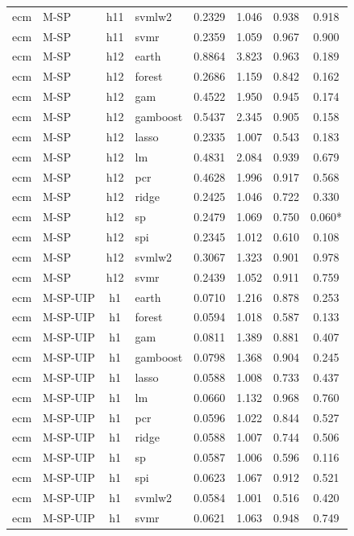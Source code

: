 \begin{ThreePartTable}
\begin{longtable}[t]{llclcccc}
ecm & M-SP & h11 & svmlw2 & 0.2329 & 1.046 & 0.938 & 0.918\\
ecm & M-SP & h11 & svmr & 0.2359 & 1.059 & 0.967 & 0.900\\
\addlinespace
ecm & M-SP & h12 & earth & 0.8864 & 3.823 & 0.963 & 0.189\\
ecm & M-SP & h12 & forest & 0.2686 & 1.159 & 0.842 & 0.162\\
ecm & M-SP & h12 & gam & 0.4522 & 1.950 & 0.945 & 0.174\\
ecm & M-SP & h12 & gamboost & 0.5437 & 2.345 & 0.905 & 0.158\\
ecm & M-SP & h12 & lasso & 0.2335 & 1.007 & 0.543 & 0.183\\
ecm & M-SP & h12 & lm & 0.4831 & 2.084 & 0.939 & 0.679\\
ecm & M-SP & h12 & pcr & 0.4628 & 1.996 & 0.917 & 0.568\\
ecm & M-SP & h12 & ridge & 0.2425 & 1.046 & 0.722 & 0.330\\
ecm & M-SP & h12 & sp & 0.2479 & 1.069 & 0.750 & 0.060*\\
ecm & M-SP & h12 & spi & 0.2345 & 1.012 & 0.610 & 0.108\\
ecm & M-SP & h12 & svmlw2 & 0.3067 & 1.323 & 0.901 & 0.978\\
ecm & M-SP & h12 & svmr & 0.2439 & 1.052 & 0.911 & 0.759\\
\addlinespace
ecm & M-SP-UIP & h1 & earth & 0.0710 & 1.216 & 0.878 & 0.253\\
ecm & M-SP-UIP & h1 & forest & 0.0594 & 1.018 & 0.587 & 0.133\\
ecm & M-SP-UIP & h1 & gam & 0.0811 & 1.389 & 0.881 & 0.407\\
ecm & M-SP-UIP & h1 & gamboost & 0.0798 & 1.368 & 0.904 & 0.245\\
ecm & M-SP-UIP & h1 & lasso & 0.0588 & 1.008 & 0.733 & 0.437\\
ecm & M-SP-UIP & h1 & lm & 0.0660 & 1.132 & 0.968 & 0.760\\
ecm & M-SP-UIP & h1 & pcr & 0.0596 & 1.022 & 0.844 & 0.527\\
ecm & M-SP-UIP & h1 & ridge & 0.0588 & 1.007 & 0.744 & 0.506\\
ecm & M-SP-UIP & h1 & sp & 0.0587 & 1.006 & 0.596 & 0.116\\
ecm & M-SP-UIP & h1 & spi & 0.0623 & 1.067 & 0.912 & 0.521\\
ecm & M-SP-UIP & h1 & svmlw2 & 0.0584 & 1.001 & 0.516 & 0.420\\
ecm & M-SP-UIP & h1 & svmr & 0.0621 & 1.063 & 0.948 & 0.749\\

\end{longtable}
\end{ThreePartTable}
